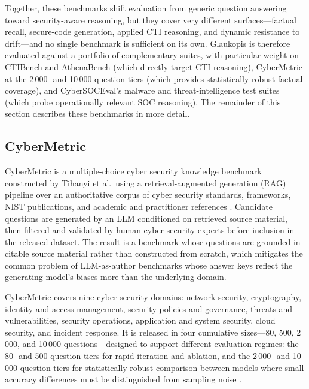 \documentclass[unnumsec,webpdf,contemporary,large]{oup-authoring-template}
\theoremstyle{thmstyleone}
\theoremstyle{thmstyletwo}
\theoremstyle{thmstylethree}
\begin{document}
Together, these benchmarks shift evaluation from generic question answering toward security-aware reasoning, but they cover very different surfaces---factual recall, secure-code generation, applied CTI reasoning, and dynamic resistance to drift---and no single benchmark is sufficient on its own. Glaukopis is therefore evaluated against a portfolio of complementary suites, with particular weight on CTIBench and AthenaBench (which directly target CTI reasoning), CyberMetric at the 2\,000- and 10\,000-question tiers (which provides statistically robust factual coverage), and CyberSOCEval's malware and threat-intelligence test suites (which probe operationally relevant SOC reasoning). The remainder of this section describes these benchmarks in more detail.

\subsection{CyberMetric}
\label{sec:cybermetric}

CyberMetric is a multiple-choice cyber security knowledge benchmark constructed by Tihanyi et al.\ using a retrieval-augmented generation (RAG) pipeline over an authoritative corpus of cyber security standards, frameworks, NIST publications, and academic and practitioner references \cite{tihanyi2024cybermetric}. Candidate questions are generated by an LLM conditioned on retrieved source material, then filtered and validated by human cyber security experts before inclusion in the released dataset. The result is a benchmark whose questions are grounded in citable source material rather than constructed from scratch, which mitigates the common problem of LLM-as-author benchmarks whose answer keys reflect the generating model's biases more than the underlying domain.

CyberMetric covers nine cyber security domains: network security, cryptography, identity and access management, security policies and governance, threats and vulnerabilities, security operations, application and system security, cloud security, and incident response. It is released in four cumulative sizes---80, 500, 2\,000, and 10\,000 questions---designed to support different evaluation regimes: the 80- and 500-question tiers for rapid iteration and ablation, and the 2\,000- and 10\,000-question tiers for statistically robust comparison between models where small accuracy differences must be distinguished from sampling noise \cite{tihanyi2024cybermetric}.
\end{document}
